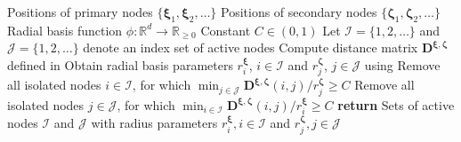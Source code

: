 \begin{algorithmic}[1]
    \Require Positions of primary nodes $\{\boldsymbol{\xi}_1, \boldsymbol{\xi}_2, \dots\}$
    \Require Positions of secondary nodes $\{\boldsymbol{\zeta}_1, \boldsymbol{\zeta}_2, \dots\}$
    \Require Radial basis function $\phi: \mathbb{R}^d \to \mathbb{R}_{\geq 0}$
    \Require Constant $C \in (0, 1)$
    \State Let $\mathcal{I} = \{1, 2, \dots \}$ and $\mathcal{J} = \{1, 2, \dots \}$ denote an index set of active nodes
    \State Compute distance matrix $\mathbf{D}^{\boldsymbol{\xi}, \boldsymbol{\zeta}}$ defined in 
        \State Obtain radial basis parameters $r^{\boldsymbol{\xi}}_i$, $i \in \mathcal{I}$ and
        $r^{\boldsymbol{\zeta}}_j$, $j \in \mathcal{J}$ using 
        \State Remove all isolated nodes $i \in \mathcal{I}$, for which $\min_{j \in \mathcal{J}} \mathbf{D}^{\boldsymbol{\xi}, \boldsymbol{\zeta}}(i, j) / r^{\boldsymbol{\zeta}}_j \geq C$
        \State Remove all isolated nodes $j \in \mathcal{J}$, for which $\min_{i \in \mathcal{I}} \mathbf{D}^{\boldsymbol{\xi}, \boldsymbol{\zeta}}(i, j) / r^{\boldsymbol{\xi}}_i \geq C$
    \EndWhile
    \State \textbf{return} Sets of active nodes $\mathcal{I}$ and $\mathcal{J}$ with radius parameters $r^{\boldsymbol{\xi}}_i, i \in \mathcal{I}$ and $r^{\boldsymbol{\zeta}}_j, j \in \mathcal{J}$
\end{algorithmic}